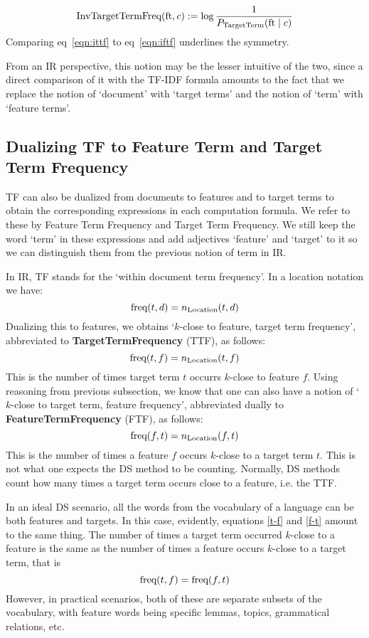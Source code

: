 \begin{equation}
\label{eqn:ittf}
\textmd{InvTargetTermFreq}(\textmd{ft}, c) :=
\log{\frac{1}{P_{\textmd{TargetTerm}}(\textmd{ft}\mid c)}}
\end{equation}
Comparing eq~\ref{eqn:ittf} to eq~\ref{eqn:iftf} underlines the symmetry.

From an IR perspective, this notion may be  the  lesser intuitive of the two, since a direct comparison of it  with the TF-IDF formula amounts to the fact that  we replace the notion of `document' with `target terms' and the notion of `term' with `feature terms'.

\subsection{Dualizing TF to Feature Term and Target Term Frequency}
\label{subsec-TF}

TF can also be dualized from documents to features and to target terms to obtain the corresponding expressions in each computation formula.  We refer to these by Feature Term Frequency and Target Term  Frequency. We still keep the  word `term'  in these expressions and add adjectives `feature' and `target'  to it so we can distinguish them from the previous notion of term in IR. 

In IR, TF stands for the `within document term frequency'. In a location notation we have:
\[
\textmd{freq}(t,d) = n_{\textmd{Location}}(t,d)
\]
Dualizing this to features, we obtains `$k$-close to feature, target  term frequency', abbreviated to {\bf TargetTermFrequency} (TTF), as follows:
\begin{equation}
\label{t-f}
\textmd{freq}(t,f) = n_{\textmd{Location}}(t,f)
\end{equation}
This is the number of times target  term $t$ occurrs $k$-close to feature $f$.  Using reasoning from previous subsection, we know that one can also have a notion of `$k$-close to target term, feature frequency', abbreviated dually to {\bf FeatureTermFrequency} (FTF), as follows:
\begin{equation}
\label{f-t}
\textmd{freq}(f,t) = n_{\textmd{Location}}(f,t)
\end{equation}
This is the number of times a feature $f$ occurs $k$-close to a target term $t$.  This is not what one expects the DS method to be counting. Normally, DS methods count how many times a target term occurs close to a feature, i.e. the TTF. 

In an ideal DS scenario, all the words from the vocabulary of a language can be both features and targets. In this case, evidently, equations \ref{t-f} and \ref{f-t} amount to the same thing. The number of times a target term occurred $k$-close to a feature is the same as the number of times a feature occurs $k$-close to a target term, that is
\begin{equation}
\label{ttf=ftf}
\textmd{freq}(t,f) = \textmd{freq}(f,t) 
\end{equation}
However, in practical scenarios, both of these are separate subsets of the vocabulary, with feature words being specific lemmas, topics, grammatical relations, etc. 

